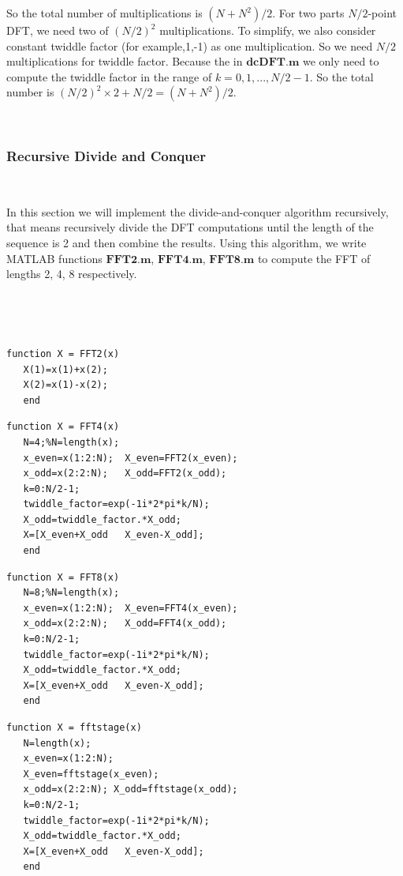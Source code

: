 \documentclass[journal]{IEEEtran}
\begin{document}
So the total number of multiplications is $(N+N^2)/2$.
For two parts $N/2$-point DFT, we need two of $(N/2)^2$ multiplications.
To simplify, we also consider constant twiddle factor (for example,1,-1) as one multiplication. So we need $N/2$ multiplications for twiddle factor. Because the in $\mathbf{dcDFT.m}$ we only need to compute the twiddle factor in the range of $k=0,1,...,N/2-1$.
So the total number is $(N/2)^2 \times2+N/2=(N+N^2)/2$.

$~$

\subsubsection{Recursive Divide and Conquer }
$~$

In this section we will implement the divide-and-conquer algorithm recursively, that means recursively divide the DFT computations until the length of the sequence is 2 and then combine the results.
Using this algorithm, we write MATLAB functions $\mathbf{FFT2.m}$, $\mathbf{FFT4.m}$, $\mathbf{FFT8.m}$ to compute the FFT of lengths 2, 4, 8 respectively.

$~$

$~$

\begin{lstlisting}[title={FFT2.m},style=Matlab-editor]
   function X = FFT2(x)
   X(1)=x(1)+x(2);
   X(2)=x(1)-x(2);
   end   
\end{lstlisting}

\begin{lstlisting}[title={FFT4.m},style=Matlab-editor]
   function X = FFT4(x)
   N=4;%N=length(x);
   x_even=x(1:2:N);  X_even=FFT2(x_even);
   x_odd=x(2:2:N);   X_odd=FFT2(x_odd);
   k=0:N/2-1;
   twiddle_factor=exp(-1i*2*pi*k/N);
   X_odd=twiddle_factor.*X_odd;
   X=[X_even+X_odd   X_even-X_odd];
   end
\end{lstlisting}

\begin{lstlisting}[title={FFT8.m},style=Matlab-editor]
   function X = FFT8(x)
   N=8;%N=length(x);
   x_even=x(1:2:N);  X_even=FFT4(x_even);
   x_odd=x(2:2:N);   X_odd=FFT4(x_odd);
   k=0:N/2-1;
   twiddle_factor=exp(-1i*2*pi*k/N);
   X_odd=twiddle_factor.*X_odd;
   X=[X_even+X_odd   X_even-X_odd];
   end
\end{lstlisting}

\begin{lstlisting}[title={fftstage.m},style=Matlab-editor]
   function X = fftstage(x)
   N=length(x);
   x_even=x(1:2:N);
   X_even=fftstage(x_even);
   x_odd=x(2:2:N); X_odd=fftstage(x_odd);
   k=0:N/2-1;
   twiddle_factor=exp(-1i*2*pi*k/N);
   X_odd=twiddle_factor.*X_odd;
   X=[X_even+X_odd   X_even-X_odd];
   end
\end{lstlisting}
\end{document}
